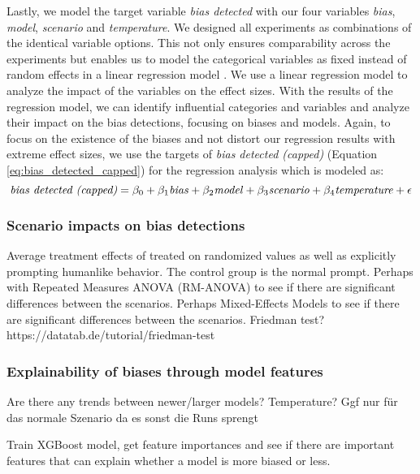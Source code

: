\par Lastly, we model the target variable \textit{bias detected} with our four variables \textit{bias}, \textit{model}, \textit{scenario} and \textit{temperature}. We designed all experiments as combinations of the identical variable options. This not only ensures comparability across the experiments but enables us to model the categorical variables as fixed instead of random effects in a linear regression model \parencite{borenstein2021introduction}. We use a linear regression model to analyze the impact of the variables on the effect sizes. With the results of the regression model, we can identify influential categories and variables and analyze their impact on the bias detections, focusing on biases and models. Again, to focus on the existence of the biases and not distort our regression results with extreme effect sizes, we use the targets of \textit{bias detected (capped)} (Equation \ref{eq:bias_detected_capped}) for the regression analysis which is modeled as:
\begin{equation} \label{eq:general_regression}
    \text{\textit{bias detected (capped)}} = \beta_0 + \beta_1 \text{\textit{bias}} + \beta_2 \text{\textit{model}} + \beta_3 \text{\textit{scenario}} + \beta_4 \text{\textit{temperature}} + \epsilon
\end{equation}


\subsubsection{Scenario impacts on bias detections}
Average treatment effects of treated on randomized values as well as explicitly prompting humanlike behavior. The control group is the normal prompt.
Perhaps with Repeated Measures ANOVA (RM-ANOVA) to see if there are significant differences between the scenarios.
Perhaps Mixed-Effects Models to see if there are significant differences between the scenarios.
Friedman test? https://datatab.de/tutorial/friedman-test

\subsubsection{Explainability of biases through model features}
Are there any trends between newer/larger models?
Temperature? Ggf nur für das normale Szenario da es sonst die Runs sprengt

Train XGBoost model, get feature importances and see if there are important features that can explain whether a model is more biased or less.
